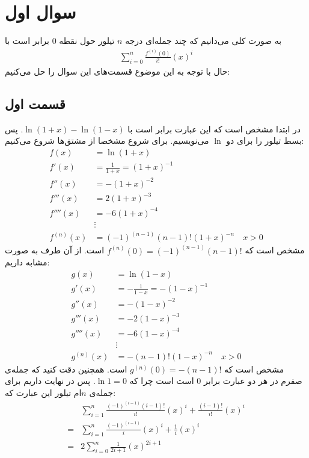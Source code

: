 \documentclass[]{article}
\begin{document}
\printheader

\section*{سوال اول}
به صورت کلی می‌دانیم که چند جمله‌ای درجه
$n$
تیلور حول نقطه 0 برابر است با
\begin{gather*}
    \sum_{i=0}^{n} \frac{f^{(i)}(0)}{i!}(x)^i
\end{gather*}
حال با توجه به این موضوع قسمت‌های این سوال را حل می‌کنیم:
\subsection*{قسمت اول}
در ابتدا مشخص است که این عبارت برابر است با $\ln(1 + x) - \ln(1 - x)$. پس بسط تیلور را برای دو $\ln$ می‌نویسیم. برای شروع مشخصا از مشتق‌ها شروع می‌کنیم:
\begin{align*}
    f(x) &= \ln(1 + x)\\
    f'(x) &= \frac{1}{1 + x} = (1 + x)^{-1}\\
    f''(x) &= -(1 + x)^{-2}\\
    f'''(x) &= 2(1 + x)^{-3}\\
    f''''(x) &= -6(1 + x)^{-4}\\
    &\vdots\\
    f^{(n)}(x) &= (-1)^{(n-1)} (n-1)! (1+x)^{-n} \quad x > 0
\end{align*}
مشخص است که
$f^{(n)}(0) = (-1)^{(n-1)} (n-1)!$
است. از آن طرف به صورت مشابه داریم:
\begin{align*}
    g(x) &= \ln(1 - x)\\
    g'(x) &= -\frac{1}{1 - x} = -(1 - x)^{-1}\\
    g''(x) &= -(1 - x)^{-2}\\
    g'''(x) &= -2(1 - x)^{-3}\\
    g''''(x) &= -6(1 - x)^{-4}\\
    &\vdots\\
    g^{(n)}(x) &= - (n-1)! (1-x)^{-n} \quad x > 0
\end{align*}
مشخص است که
$g^{(n)}(0) = -(n-1)!$
است. همچنین دقت کنید که جمله‌ی صفرم در هر دو عبارت برابر 0 است
است چرا که $\ln 1 = 0$.
پس در نهایت داریم برای جمله‌ی
$n$ام
تیلور این عبارت که:
\begin{align*}
    &\sum_{i=1}^{n} \frac{(-1)^{(i-1)} (i-1)!}{i!}(x)^i + \frac{(i-1)!}{i!}(x)^i\\
    =&\sum_{i=1}^{n} \frac{(-1)^{(i-1)}}{i}(x)^i + \frac{1}{i}(x)^i\\
    =&\boxed{2\sum_{i=0}^{n} \frac{1}{2i+1}(x)^{2i+1}}
\end{align*}
\end{document}
